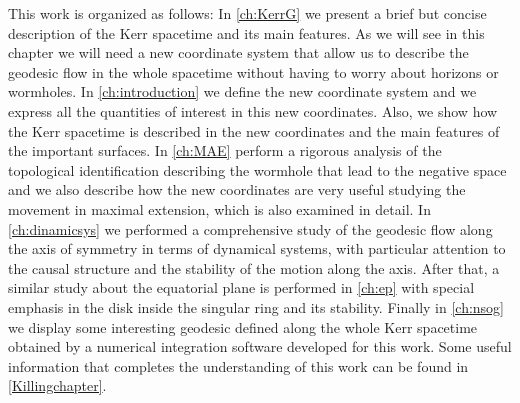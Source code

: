 This work is organized as follows: In \cref{ch:KerrG} we present a brief but concise description of the Kerr spacetime and its main features. As we will see in this chapter we will need a new coordinate system that allow us to describe the geodesic flow in the whole spacetime without having to worry about  horizons or wormholes. In \cref{ch:introduction} we define the new coordinate system and we express all the quantities of interest in this new coordinates. Also, we show how the Kerr spacetime is described in the new coordinates and the main features of the important surfaces. In \cref{ch:MAE} perform a rigorous analysis of the topological identification describing the wormhole that lead to the negative space and we also describe how the new coordinates are very useful studying the movement in maximal extension, which is also examined in detail. In \cref{ch:dinamicsys} we performed a comprehensive study of the geodesic flow along the axis of symmetry in terms of dynamical systems, with particular attention to the causal structure and the stability of the motion along the axis. After that, a similar study about the equatorial plane is performed in \cref{ch:ep} with special emphasis in the disk inside the singular ring and its stability. Finally in \cref{ch:nsog} we display some interesting geodesic defined along the whole Kerr spacetime obtained by a numerical integration software developed for this work. Some useful information that completes the understanding of this work can be found in \cref{Killingchapter}.
